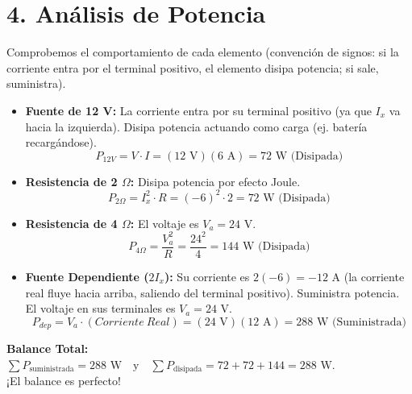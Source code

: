 \documentclass[12pt, a4paper]{article}
\begin{document}
\section*{4. Análisis de Potencia}
Comprobemos el comportamiento de cada elemento (convención de signos: si la corriente entra por el terminal positivo, el elemento disipa potencia; si sale, suministra).

\begin{itemize}
    \item \textbf{Fuente de 12 V:} La corriente entra por su terminal positivo (ya que $I_x$ va hacia la izquierda). Disipa potencia actuando como carga (ej. batería recargándose).
    $$ P_{12V} = V \cdot I = (12\text{ V})(6\text{ A}) = 72\text{ W (Disipada)} $$
    
    \item \textbf{Resistencia de 2 $\Omega$:} Disipa potencia por efecto Joule.
    $$ P_{2\Omega} = I_x^2 \cdot R = (-6)^2 \cdot 2 = 72\text{ W (Disipada)} $$
    
    \item \textbf{Resistencia de 4 $\Omega$:} El voltaje es $V_a = 24\text{ V}$.
    $$ P_{4\Omega} = \frac{V_a^2}{R} = \frac{24^2}{4} = 144\text{ W (Disipada)} $$
    
    \item \textbf{Fuente Dependiente ($2I_x$):} Su corriente es $2(-6) = -12\text{ A}$ (la corriente real fluye hacia arriba, saliendo del terminal positivo). Suministra potencia. El voltaje en sus terminales es $V_a = 24\text{ V}$.
    $$ P_{dep} = V_a \cdot (Corriente\ Real) = (24\text{ V})(12\text{ A}) = 288\text{ W (Suministrada)} $$
\end{itemize}

\textbf{Balance Total:} $\sum P_{\text{suministrada}} = 288\text{ W} \quad \text{y} \quad \sum P_{\text{disipada}} = 72 + 72 + 144 = 288\text{ W}$. \\
¡El balance es perfecto!
\end{document}
